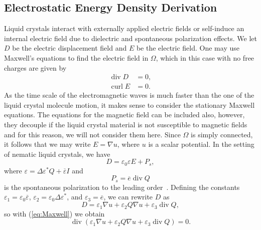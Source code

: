 \documentclass[10pt,letterpaper]{amsart}
\theoremstyle{definition}{\newtheorem{definition}[lemma]{Definition}}
\theoremstyle{note}{\newtheorem{claim}{Claim}[section]
\newtheorem*{claim*}{Claim}}
\numberwithin{equation}{section}
\begin{document}
\subsection{Electrostatic Energy Density Derivation}
Liquid crystals interact with externally applied electric fields or self-induce an internal electric field due to dielectric and spontaneous polarization effects. We let $D$ be the electric displacement field and $E$ be the electric field. One may use Maxwell's equations to find the electric field in $\Omega$, which in this case with no free charges are given by
\begin{equation}
\label{eq:Maxwell}
    \begin{split}
        \operatorname{div}D &= 0,\\
        \operatorname{curl}E &= 0.
    \end{split}
\end{equation}
As the time scale of the electromagnetic waves is much faster than the one of the liquid crystal molecule motion, it makes sense to consider the stationary Maxwell equations. The equations for the magnetic field can be included also, however, they decouple if the liquid crystal material is not susceptible to magnetic fields and for this reason, we will not consider them here. 
Since $\Omega$ is simply connected, it follows that we may write $E = \nabla u$, where $u$ is a scalar potential. In the setting of nematic liquid crystals, we have
\begin{equation*}
    D = \varepsilon_0 \varepsilon E + P_s,
\end{equation*}
where $\varepsilon = \Delta\varepsilon^\ast Q + \overline{\varepsilon}I$ and
\begin{equation*}
    P_s = \overline{e}\operatorname{div}Q
\end{equation*}
is the spontaneous polarization to the leading order~\cite{mottram2014}. Defining the constants $\varepsilon_1 = \varepsilon_0\overline{\varepsilon}$, $\varepsilon_2 = \varepsilon_0\Delta\varepsilon^\ast$, and $\varepsilon_3 = \overline{e}$, we can rewrite $D$ as 
\begin{equation*}
    D = \varepsilon_1\nabla u + \varepsilon_2 Q\nabla u + \varepsilon_3\operatorname{div}Q,
\end{equation*}
so with (\ref{eq:Maxwell}) we obtain
\begin{equation}\label{eq:ellipticEfield}
    \operatorname{div}(\varepsilon_1\nabla u + \varepsilon_2 Q\nabla u + \varepsilon_3\operatorname{div}Q) = 0.
\end{equation}
\end{document}
